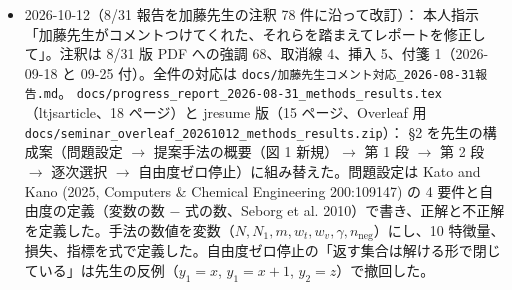 \documentclass[11pt,a4paper]{jsarticle}
\begin{document}
\begin{itemize}[nosep]
    \textbf{MAP の定義の食い違い}：\texttt{evaluate\_multi\_eq.py} の AP は、並べた中に入った正解式だけで平均する（入らなかった正解式を 0 と数えない）。baseline は全データベースを並べるので両定義で同じだが、候補 $k$ 件しか並べない提案手法の MAP は標準の定義より高く出る（設定 A 0.863 $\to$ 0.796、設定 B 0.832 $\to$ 0.715。保存済みの per-case の順位から読み取りだけで再計算）。修論では実装どおりに AP を定義し、標準の定義の値を併記した。標準の定義でも、最良の baseline を 10 分割すべてで上回る。日本語版報告の MAP の式（$1/K$ で割る）は実装と合っていない。
    図：PFI を日本語版と同じ構成の英語版にした（\texttt{generate\_figures\_thesis.py} の \texttt{pfi()}。配色は dataviz の検証スクリプトで確認）。比較の図と特性別の図を最良の重みの baseline に、DoF-stop の図の注記を停止条件の充足率に改め、図 1 の ``degrees of freedom 0''・``closed'' と、逐次選択の図の ``By difficulty'' をやめた。
    抽出モデル：本人確認（親セッション経由、「追加した文献の抽出はClaudeを使った」）を受け、\S 4.1 と \S 5.4 に「研究の初期に集めた 39 報は Gemini 2.5 Pro、その後に追加した文献は Claude（版の記録なし）で抽出」と書き、基礎式集を生成したのは Gemini 2.5 Pro と明記した（日本語版 \S 3.1 と同じ。TODO は解消）。Claude への指示が数値例・一段の代入・演習問題の式を除くことも書き、第 1 章と \S 6.6 の「1 つの LLM が抽出」を複数形に改めた。
    訂正：1e8bd63 では第 1 章の \% source コメントの後ろに次の文が同じ行で続いたため、``The database holds 11,146 equations from 361 sources'' で始まる文の前半が消えていた（PDF では文頭の欠けた文になった）。行を分けて直し、PDF の本文に小文字で始まる文が残っていないことを確かめた。
    ビルド：\texttt{latexmk -gg} exit 0、未定義参照 0、文献 40 件（\texttt{main.aux} の引用初出順と一致）、Overfull は既存の目次の 5 件。本文は 1〜28 ページ（規範 20〜28 の上限、圧縮設定のまま）。引き継ぎメモは side-session-notes の \texttt{thesis\_alignment\_2026-10-12.md}。
  \item 2026-10-12（8/31 報告を加藤先生の注釈 78 件に沿って改訂）：
    本人指示「加藤先生がコメントつけてくれた、それらを踏まえてレポートを修正して」。注釈は 8/31 版 PDF への強調 68、取消線 4、挿入 5、付箋 1（2026-09-18 と 09-25 付）。全件の対応は \texttt{docs/加藤先生コメント対応\_2026-08-31報告.md}。
    \texttt{docs/progress\_report\_2026-08-31\_methods\_results.tex}（ltjsarticle、18 ページ）と jresume 版（15 ページ、Overleaf 用 \texttt{docs/seminar\_overleaf\_20261012\_methods\_results.zip}）：
    \S 2 を先生の構成案（問題設定 $\to$ 提案手法の概要（図 1 新規）$\to$ 第 1 段 $\to$ 第 2 段 $\to$ 逐次選択 $\to$ 自由度ゼロ停止）に組み替えた。問題設定は Kato and Kano (2025, Computers \& Chemical Engineering 200:109147) の 4 要件と自由度の定義（変数の数 $-$ 式の数、Seborg et al. 2010）で書き、正解と不正解を定義した。手法の数値を変数（$N, N_1, m, w_t, w_v, \gamma, n_{\mathrm{neg}}$）にし、10 特徴量、損失、指標を式で定義した。自由度ゼロ停止の「返す集合は解ける形で閉じている」は先生の反例（$y_1=x$, $y_1=x+1$, $y_2=z$）で撤回した。

\end{itemize}
\end{document}
